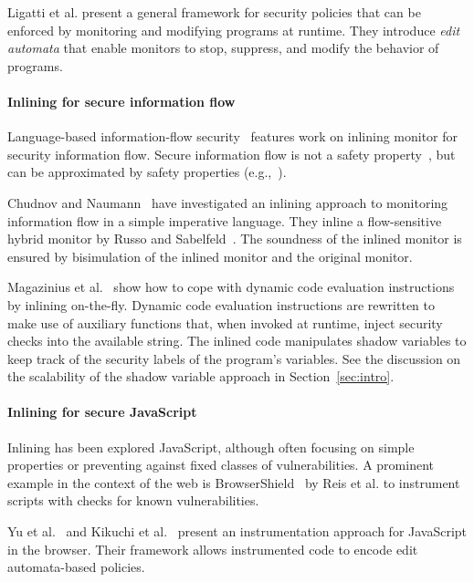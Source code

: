 \documentclass{llncs}
\begin{document}
Ligatti et al. \cite{Ligatti05editautomata:} present a 
general framework for security policies that can
be enforced by monitoring and modifying programs at runtime. 
They introduce \emph{edit automata} that enable
monitors to stop, suppress, and modify the behavior of programs. 



\paragraph{Inlining for secure information flow}
Language-based information-flow security~\cite{Sabelfeld:Myers:JSAC}
features work on inlining monitor for security information flow.
Secure information flow is not
a safety property~\cite{McLean:SSP94}, but can be approximated by
safety properties
(e.g.,~\cite{Boudol:FAST08,Sabelfeld:Russo:PSI09,Austin:Flanagan:PLAS09}).

Chudnov and
Naumann~\cite{Chudnov:Naumann:CSF10} have investigated an inlining
approach to monitoring information flow in a simple imperative language. They inline a flow-sensitive
hybrid monitor by Russo and
Sabelfeld~\cite{Russo:Sabelfeld:CSF10}. The soundness of the inlined
monitor is ensured by bisimulation of the inlined monitor and the
original monitor.

Magazinius et
al.~\cite{Magazinius+:SEC10,DBLP:journals/compsec/MagaziniusRS12} show
how to cope with dynamic code evaluation instructions by inlining
on-the-fly. 
Dynamic code evaluation instructions are
rewritten to make use of auxiliary functions that, when invoked at
runtime, inject security checks into the available string. 
The inlined code manipulates shadow variables to keep track of the
security labels of the program's variables.
See the discussion on the scalability of the shadow variable approach
in Section~\ref{sec:intro}.


\paragraph{Inlining for secure JavaScript}
Inlining has been explored JavaScript, although often focusing on
simple properties or preventing against fixed classes of vulnerabilities.
A prominent example in the context of the web is
BrowserShield~\cite{Reis+:TWeb07} by Reis et al. to instrument scripts with
checks for known vulnerabilities.

Yu et al.~\cite{Yu+:POPL07} and Kikuchi et
al.~\cite{DBLP:conf/aplas/2008} present an instrumentation approach
for JavaScript in the browser. Their framework allows instrumented
code to encode edit automata-based policies.
\end{document}
